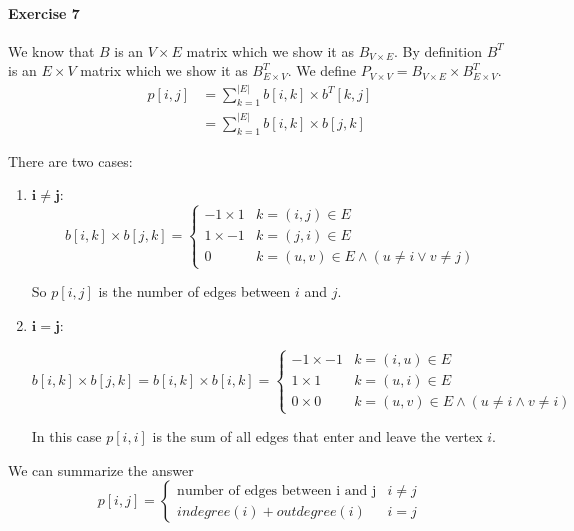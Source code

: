 \documentclass{book}
\begin{document}
	\paragraph{Exercise 7}
	We know that $B$ is an $V \times E$ matrix which we show it as $B_{V \times E}$. By definition $B^T$ is an $E \times V$ matrix which we show it as $B_{E \times V}^T$. We define $P_{V \times V} = B_{V \times E} \times B_{E \times V}^T$.
	\begin{equation*}	
	\begin{split}
		p[i, j] &= \sum_{k = 1}^{|E|}b[i, k] \times b^T[k, j] \\
		&= \sum_{k = 1}^{|E|}b[i, k] \times b[j, k]
	\end{split}
	\end{equation*}
	
	There are two cases:
	\begin{enumerate}
		\item $\boldsymbol{i \ne j:}$
			\begin{equation*}
			b[i, k] \times b[j, k] = \begin{cases}
			-1 \times 1 & k = (i, j) \in E \\
			1 \times -1 & k = (j, i) \in E \\
			0 & k = (u, v) \in E \land (u \ne i \lor v \ne j)
			\end{cases}
			\end{equation*}
			
			So $p[i, j]$ is the number of edges between $i$ and $j$.
			
		\item $\boldsymbol{i = j:}$
		
			\begin{equation*}
			b[i, k] \times b[j, k] = b[i, k] \times b[i, k] = \begin{cases}
			-1 \times -1 & k = (i, u) \in E \\
			1 \times 1 & k = (u, i) \in E \\
			0 \times 0 & k = (u, v) \in E \land (u \ne i \land v \ne i)
			\end{cases}
			\end{equation*}
			
			In this case $p[i, i]$ is the sum of all edges that enter and leave the vertex $i$.		
	\end{enumerate}
	We can summarize the answer
	\begin{equation*}
		p[i, j] = \begin{cases}
		\text{number of edges between i and j} & i \ne j \\
		indegree(i) + outdegree(i) & i = j
		\end{cases}
	\end{equation*}
	
\end{document}
